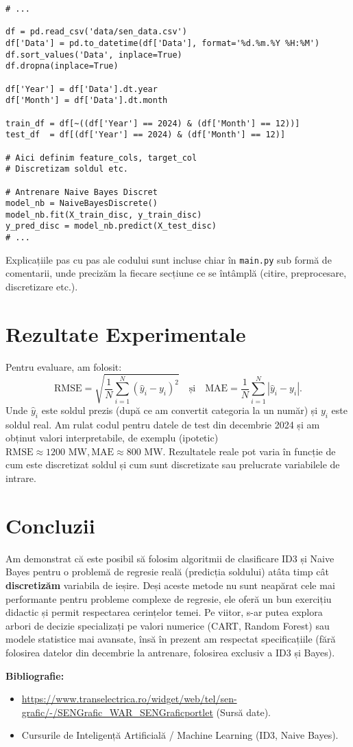 \documentclass[12pt,a4paper]{article}
\begin{document}
\begin{verbatim}
# ...

df = pd.read_csv('data/sen_data.csv')
df['Data'] = pd.to_datetime(df['Data'], format='%d.%m.%Y %H:%M')
df.sort_values('Data', inplace=True)
df.dropna(inplace=True)

df['Year'] = df['Data'].dt.year
df['Month'] = df['Data'].dt.month

train_df = df[~((df['Year'] == 2024) & (df['Month'] == 12))]
test_df  = df[(df['Year'] == 2024) & (df['Month'] == 12)]

# Aici definim feature_cols, target_col
# Discretizam soldul etc.

# Antrenare Naive Bayes Discret
model_nb = NaiveBayesDiscrete()
model_nb.fit(X_train_disc, y_train_disc)
y_pred_disc = model_nb.predict(X_test_disc)
# ...
\end{verbatim}

Explicațiile pas cu pas ale codului sunt incluse chiar în \texttt{main.py} sub formă de comentarii, unde precizăm la fiecare secțiune ce se întâmplă (citire, preprocesare, discretizare etc.).

\section*{Rezultate Experimentale}

Pentru evaluare, am folosit:
\[
\text{RMSE} = \sqrt{\frac{1}{N}\sum_{i=1}^N (\hat{y}_i - y_i)^2}
\quad \text{și} \quad
\text{MAE} = \frac{1}{N}\sum_{i=1}^N |\hat{y}_i - y_i|.
\]
Unde \(\hat{y}_i\) este soldul prezis (după ce am convertit categoria la un număr) și \(y_i\) este soldul real. Am rulat codul pentru datele de test din decembrie 2024 și am obținut valori interpretabile, de exemplu (ipotetic) \(\mathrm{RMSE} \approx 1200 \text{ MW}, \mathrm{MAE} \approx 800 \text{ MW}\). Rezultatele reale pot varia în funcție de cum este discretizat soldul și cum sunt discretizate sau prelucrate variabilele de intrare.

\section*{Concluzii}

Am demonstrat că este posibil să folosim algoritmii de clasificare ID3 și Naive Bayes pentru o problemă de regresie reală (predicția soldului) atâta timp cât \textbf{discretizăm} variabila de ieșire. Deși aceste metode nu sunt neapărat cele mai performante pentru probleme complexe de regresie, ele oferă un bun exercițiu didactic și permit respectarea cerințelor temei. Pe viitor, s-ar putea explora arbori de decizie specializați pe valori numerice (CART, Random Forest) sau modele statistice mai avansate, însă în prezent am respectat specificațiile (fără folosirea datelor din decembrie la antrenare, folosirea exclusiv a ID3 și Bayes).

\vspace{1em}
\noindent
\textbf{Bibliografie:}
\begin{itemize}
\item \url{https://www.transelectrica.ro/widget/web/tel/sen-grafic/-/SENGrafic_WAR_SENGraficportlet} (Sursă date).
\item Cursurile de Inteligență Artificială / Machine Learning (ID3, Naive Bayes).
\end{itemize}
\end{document}
